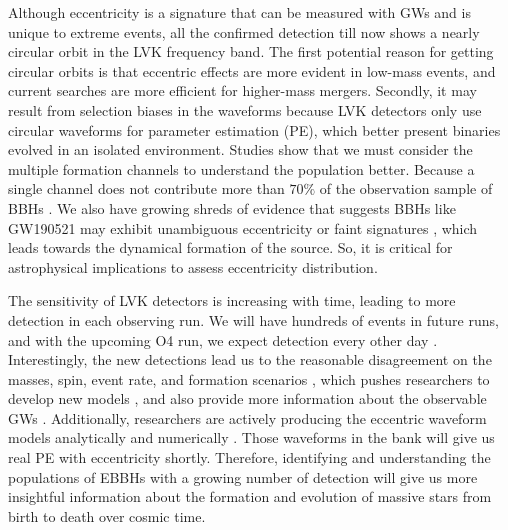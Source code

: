 \documentclass[twocolumn,prd,nofootinbib]{revtex4}
\begin{document}
Although eccentricity is a signature that can be measured with GWs and is unique to extreme events, all the confirmed detection till now shows a nearly circular orbit in the LVK frequency band. The first potential reason for getting circular orbits is that eccentric effects are more evident in low-mass events, and current searches are more efficient for higher-mass mergers. Secondly, it may result from selection biases in the waveforms because LVK detectors only use circular waveforms for parameter estimation (PE), which better present binaries evolved in an isolated environment. Studies show that we must consider the multiple formation channels to understand the population better. Because a single channel does not contribute more than $70\%$ of the observation sample of BBHs \cite{zevin-2021}. We also have growing shreds of evidence that suggests BBHs like GW190521 may exhibit unambiguous eccentricity or faint signatures \cite{Gamba_2022_GW190521_dynamical,yumeng-2023,Isobel-2022}, which leads towards the dynamical formation of the source. So, it is critical for astrophysical implications to assess eccentricity distribution.


The sensitivity of LVK detectors is increasing with time, leading to more detection in each observing run. We will have hundreds of events in future runs, and with the upcoming O4 run, we expect detection every other day \cite{detection_rate_2016,detection_rate_2015}. 
Interestingly, the new detections lead us to the reasonable disagreement on the masses, spin, event rate, and formation scenarios \cite{LSC-BBH-2016, LSC-GW150914-2016}, which pushes researchers to develop new models \cite{Mandel-2016,marchant-2016}, and also provide more information about the observable GWs \cite{Barausse-2018, Abbot-2016-schotastic,dvorkin-2016}. Additionally, researchers are actively producing the eccentric waveform models analytically \cite{Huerta-2014} and numerically \cite{gold-2016,hinder-2010, Healy-2022, Alessandro-2022, Campanelli-2009}. Those waveforms in the bank will give us real PE with eccentricity shortly. Therefore, identifying and understanding the populations of EBBHs with a growing number of detection will give us more insightful information about the formation and evolution of massive stars from birth to death over cosmic time.
 
\end{document}

